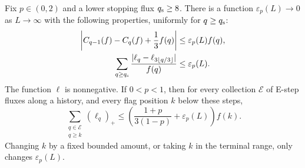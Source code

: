 \begin{lemma}\label{lem:charge-scalars}
Fix $p\in(0,2)$ and a lower stopping flux $q_{\rm s}\ge8$.  There is a
function $\varepsilon_p(L)\to0$ as $L\to\infty$ with the following
properties, uniformly for $q\ge q_{\rm s}$:
\begin{align}
 \left|C_{q-1}(f)-C_q(f)+\frac13f(q)\right|
 &\le\varepsilon_p(L)f(q),\label{eq:charge-F-scalar}\\
 \sum_{q\ge q_{\rm s}}
 \frac{|\ell_q-\ell_{3\lfloor q/3\rfloor}|}{f(q)}
 &\le\varepsilon_p(L).\label{eq:charge-calibration-scalar}
\end{align}
The function $\ell$ is nonnegative.  If $0<p<1$, then for every
collection $\mathcal E$ of E-step fluxes along a history, and every
flag position $k$ below these steps,
\begin{equation}\label{eq:charge-scalar-tail}
 \sum_{\substack{q\in\mathcal E\\q\ge k}}(\ell_q)_+
 \le \left(\frac{1+p}{3(1-p)}+\varepsilon_p(L)\right)f(k).
\end{equation}
Changing $k$ by a fixed bounded amount, or taking $k$ in the terminal
range, only changes $\varepsilon_p(L)$.
\end{lemma}

